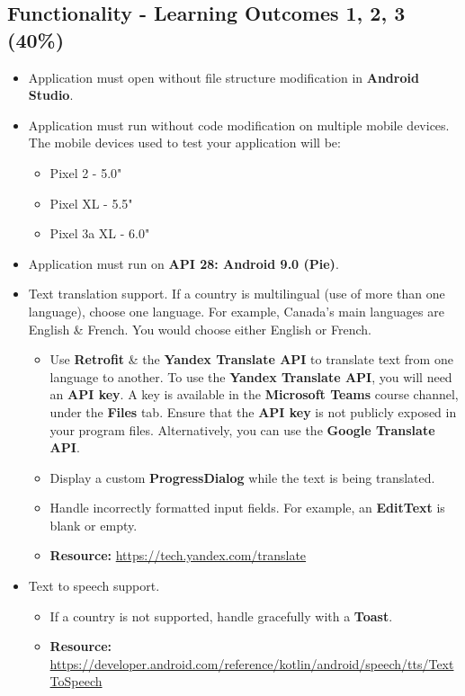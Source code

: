 \documentclass{article}
\begin{document}
\subsection*{Functionality - Learning Outcomes 1, 2, 3 (40\%)}
\begin{itemize}
	\item Application must open without file structure modification in \textbf{Android Studio}.
	\item Application must run without code modification on multiple mobile devices. The mobile devices used to test your application will be:
	      \begin{itemize}
		      \item Pixel 2 - 5.0"
		      \item Pixel XL - 5.5"
		      \item Pixel 3a XL - 6.0"
	      \end{itemize}
	\item Application must run on \textbf{API 28: Android 9.0 (Pie)}.
	\item Text translation support. If a country is multilingual (use of more than one language), choose one language. For example, Canada's main languages are English \& French. You would choose either English or French.
	      \begin{itemize}
		      \item Use \textbf{Retrofit} \& the \textbf{Yandex Translate API} to translate text from one language to another. To use the \textbf{Yandex Translate API}, you will need an \textbf{API key}. A key is available in the \textbf{Microsoft Teams} course channel, under the \textbf{Files} tab. Ensure that the \textbf{API key} is not publicly exposed in your program files. Alternatively, you can use the \textbf{Google Translate API}.
		      \item Display a custom \textbf{ProgressDialog} while the text is being translated.
		      \item Handle incorrectly formatted input fields. For example, an \textbf{EditText} is blank or empty.
		      \item \textbf{Resource:} \footnotesize\href{https://tech.yandex.com/translate}{https://tech.yandex.com/translate}
	      \end{itemize}
	\item Text to speech support.
	      \begin{itemize}
		      \item If a country is not supported, handle gracefully with a \textbf{Toast}.
		      \item \textbf{Resource:} \footnotesize\href{https://developer.android.com/reference/kotlin/android/speech/tts/TextToSpeech}{https://developer.android.com/reference/kotlin/android/speech/tts/TextToSpeech}

\end{itemize}
\end{itemize}
\end{document}
